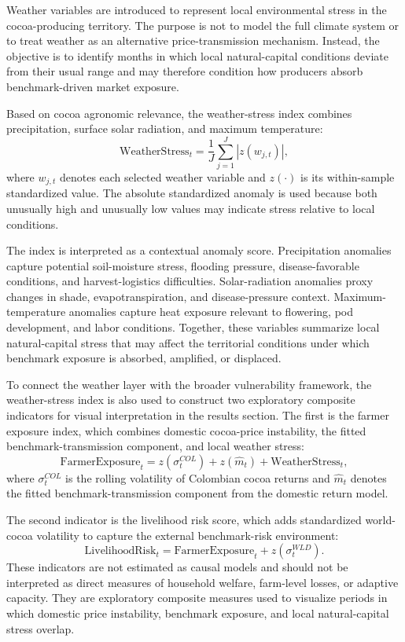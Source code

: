 \documentclass[11pt]{article}
\begin{document}
Weather variables are introduced to represent local environmental stress in the cocoa-producing territory. The purpose is not to model the full climate system or to treat weather as an alternative price-transmission mechanism. Instead, the objective is to identify months in which local natural-capital conditions deviate from their usual range and may therefore condition how producers absorb benchmark-driven market exposure.

Based on cocoa agronomic relevance, the weather-stress index combines precipitation, surface solar radiation, and maximum temperature:
\begin{equation}
\mathrm{WeatherStress}_t =
\frac{1}{J}\sum_{j=1}^{J}\left|z(w_{j,t})\right|,
\label{eq:weather_stress}
\end{equation}
where $w_{j,t}$ denotes each selected weather variable and $z(\cdot)$ is its within-sample standardized value. The absolute standardized anomaly is used because both unusually high and unusually low values may indicate stress relative to local conditions.

The index is interpreted as a contextual anomaly score. Precipitation anomalies capture potential soil-moisture stress, flooding pressure, disease-favorable conditions, and harvest-logistics difficulties. Solar-radiation anomalies proxy changes in shade, evapotranspiration, and disease-pressure context. Maximum-temperature anomalies capture heat exposure relevant to flowering, pod development, and labor conditions. Together, these variables summarize local natural-capital stress that may affect the territorial conditions under which benchmark exposure is absorbed, amplified, or displaced.

To connect the weather layer with the broader vulnerability framework, the weather-stress index is also used to construct two exploratory composite indicators for visual interpretation in the results section. The first is the farmer exposure index, which combines domestic cocoa-price instability, the fitted benchmark-transmission component, and local weather stress:
\begin{equation}
\mathrm{FarmerExposure}_t =
z(\sigma^{COL}_t) + z(\widehat{m}_t) + \mathrm{WeatherStress}_t,
\label{eq:farmer_exposure}
\end{equation}
where $\sigma^{COL}_t$ is the rolling volatility of Colombian cocoa returns and $\widehat{m}_t$ denotes the fitted benchmark-transmission component from the domestic return model.

The second indicator is the livelihood risk score, which adds standardized world-cocoa volatility to capture the external benchmark-risk environment:
\begin{equation}
\mathrm{LivelihoodRisk}_t =
\mathrm{FarmerExposure}_t + z(\sigma^{WLD}_t).
\label{eq:livelihood_risk}
\end{equation}
These indicators are not estimated as causal models and should not be interpreted as direct measures of household welfare, farm-level losses, or adaptive capacity. They are exploratory composite measures used to visualize periods in which domestic price instability, benchmark exposure, and local natural-capital stress overlap.
\end{document}
